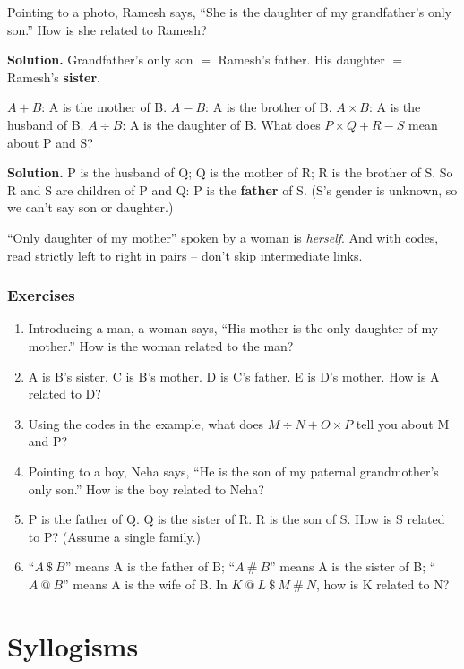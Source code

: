 \documentclass[11pt,a4paper,openany]{report}
\newenvironment{exercises}{\subsection*{Exercises \thechapter}\begin{enumerate}[label=\textbf{\thechapter.\arabic*},leftmargin=3.2em]}{\end{enumerate}}
\begin{document}
\begin{example}
Pointing to a photo, Ramesh says, ``She is the daughter of my grandfather's only son.'' How is she related to Ramesh?

\textbf{Solution.} Grandfather's only son $=$ Ramesh's father. His daughter $=$ Ramesh's \textbf{sister}.
\end{example}

\begin{example}
$A+B$: A is the mother of B. $A-B$: A is the brother of B. $A\times B$: A is the husband of B. $A\div B$: A is the daughter of B.
What does $P\times Q+R-S$ mean about P and S?

\textbf{Solution.} P is the husband of Q; Q is the mother of R; R is the brother of S. So R and S are children of P and Q: P is the \textbf{father} of S.
(S's gender is unknown, so we can't say son or daughter.)
\end{example}

\begin{trap}
``Only daughter of my mother'' spoken by a woman is \emph{herself}. And with codes, read strictly left to right in pairs -- don't skip intermediate links.
\end{trap}

\begin{exercises}
\item Introducing a man, a woman says, ``His mother is the only daughter of my mother.'' How is the woman related to the man?
\item A is B's sister. C is B's mother. D is C's father. E is D's mother. How is A related to D?
\item Using the codes in the example, what does $M\div N+O\times P$ tell you about M and P?
\item Pointing to a boy, Neha says, ``He is the son of my paternal grandmother's only son.'' How is the boy related to Neha?
\item P is the father of Q. Q is the sister of R. R is the son of S. How is S related to P? (Assume a single family.)
\item ``$A\ \$\ B$'' means A is the father of B; ``$A\ \#\ B$'' means A is the sister of B; ``$A\ @\ B$'' means A is the wife of B. In $K\ @\ L\ \$\ M\ \#\ N$, how is K related to N?
\end{exercises}

\chapter{Syllogisms}\label{ch:syl}
\end{document}
